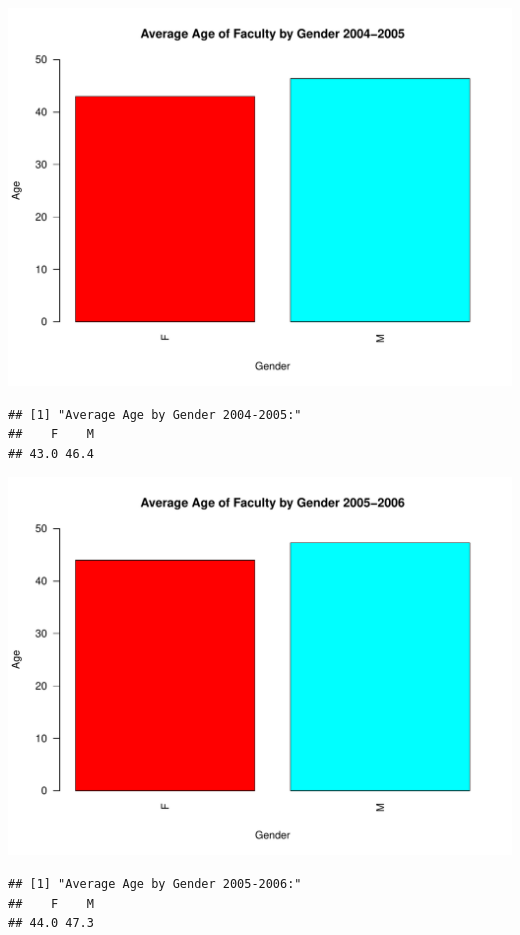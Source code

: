 \documentclass[12pt,a4paper]{article}\usepackage[]{graphicx}\usepackage[]{color}
\makeatletter
\def\maxwidth{ %
  \ifdim\Gin@nat@width>\linewidth
    \linewidth
  \else
    \Gin@nat@width
  \fi
}
\newenvironment{kframe}{%
 \def\at@end@of@kframe{}%
 \ifinner\ifhmode%
  \def\at@end@of@kframe{\end{minipage}}%
  \begin{minipage}{\columnwidth}%
 \fi\fi%
 \def\FrameCommand##1{\hskip\@totalleftmargin \hskip-\fboxsep
 \colorbox{shadecolor}{##1}\hskip-\fboxsep
     \hskip-\linewidth \hskip-\@totalleftmargin \hskip\columnwidth}%
 \MakeFramed {\advance\hsize-\width
   \@totalleftmargin\z@ \linewidth\hsize
   \@setminipage}}%
 {\par\unskip\endMakeFramed%
 \at@end@of@kframe}
\newenvironment{knitrout}{}{} %
\theoremstyle{definition}
\makeatother
\begin{document}
\begin{knitrout}
\color{fgcolor}
\includegraphics[width=\maxwidth]{figure/unnamed-chunk-10-1} 
\begin{kframe}\begin{verbatim}
## [1] "Average Age by Gender 2004-2005:"
##    F    M 
## 43.0 46.4
\end{verbatim}
\end{kframe}
\includegraphics[width=\maxwidth]{figure/unnamed-chunk-10-2} 
\begin{kframe}\begin{verbatim}
## [1] "Average Age by Gender 2005-2006:"
##    F    M 
## 44.0 47.3
\end{verbatim}

\end{kframe}
\end{knitrout}
\end{document}
